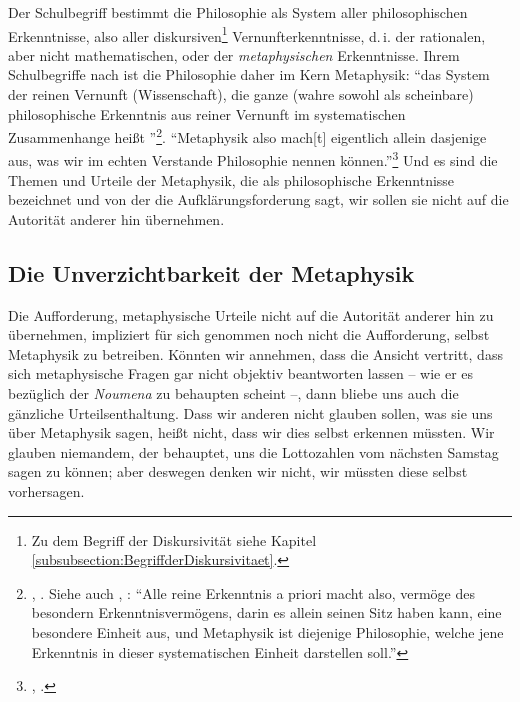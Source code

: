 Der Schulbegriff bestimmt die Philosophie als System aller philosophischen
Erkenntnisse, also aller diskursiven\footnote{Zu dem Begriff der Diskursivität
siehe Kapitel \ref{subsubsection:BegriffderDiskursivitaet}.} Vernunfterkenntnisse, d.\,i.
der rationalen, aber nicht mathematischen, oder der \emph{metaphysischen} Erkenntnisse. Ihrem
Schulbegriffe nach ist die Philosophie daher im Kern Metaphysik: \enquote{das
System der reinen Vernunft (Wissenschaft), die ganze (wahre sowohl als scheinbare)
philosophische Erkenntnis aus reiner Vernunft im systematischen Zusammenhange
{\punkt} heißt
}\footnote{\cite[][B 869]{Kant:KritikderreinenVernunft2003},
\cite[][III: 543.29--544.2]{Kant:GesammelteWerke1900ff.}. Siehe auch
\cite[][B 873]{Kant:KritikderreinenVernunft2003},
\cite[][III: 546.8--11]{Kant:GesammelteWerke1900ff.}:
\enquote{Alle reine Erkenntnis a priori macht also, vermöge des besondern
Erkenntnisvermögens, darin es allein seinen Sitz haben kann, eine besondere
Einheit aus, und Metaphysik ist diejenige Philosophie, welche jene Erkenntnis in
dieser systematischen Einheit darstellen soll.}}. \enquote{Metaphysik also
{\punkt} mach[t] eigentlich allein dasjenige aus, was wir im echten Verstande
Philosophie nennen können.}\footnote{\cite[][B
878]{Kant:KritikderreinenVernunft2003}, \cite[][III:
549.13--16]{Kant:GesammelteWerke1900ff.}.} Und es sind  die Themen und Urteile
der Metaphysik, die  als philosophische Erkenntnisse
bezeichnet und von der die Aufklärungsforderung sagt, wir sollen sie nicht auf
die Autorität anderer hin übernehmen.

\subsection{Die Unverzichtbarkeit der
Metaphysik}\label{paragraph:DieUnverzichtbarkeitderMetaphysik}
Die Aufforderung, metaphysische Urteile nicht auf die Autorität anderer hin zu
übernehmen, impliziert für sich genommen noch nicht die Aufforderung, selbst
Metaphysik zu betreiben. Könnten wir annehmen, dass  die
Ansicht vertritt, dass sich metaphysische Fragen gar nicht objektiv beantworten
lassen -- wie er es bezüglich der \emph{Noumena} zu behaupten scheint --, dann bliebe uns
auch die gänzliche Urteilsenthaltung. Dass wir anderen nicht glauben sollen, was
sie uns über Metaphysik sagen, heißt nicht, dass wir dies selbst erkennen
müssten. Wir glauben niemandem, der behauptet, uns die Lottozahlen vom nächsten
Samstag sagen zu können; aber deswegen denken wir nicht, wir müssten diese
selbst vorhersagen.

